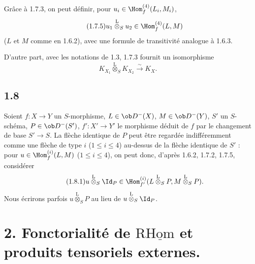 Grâce à 1.7.3, on peut définir, pour $u_i\in\Hom_f^{(4)}(L_i,M_i)$,
\begin{equation}\tag{1.7.5}
u_1\overset{\mathrm{L}}{\otimes}_{S}u_2\in\Hom_f^{(4)}(L,M)
\end{equation}
($L$ et $M$ comme en 1.6.2), avec une formule de transitivité analogue à 1.6.3.

D'autre part, avec les notations de 1.3, 1.7.3 fournit un isomorphisme
\begin{equation}\tag{1.7.6}
K_{X_1}\overset{\mathrm{L}}{\otimes}_{S}K_{X_2}\xrightarrow{\sim}K_X.
\end{equation}

\subsection*{1.8}
Soient $f:X\to Y$ un $S$-morphisme, $L\in\ob D^{-}(X)$, $M\in\ob D^{-}(Y)$, $S'$ un $S$-schéma, $P\in\ob D^{-}(S')$, $f':X'\to Y'$ le morphisme déduit de $f$ par le changement de base $S'\to S$. La flèche identique de $P$ peut être regardée indifféremment comme une flèche de type $i$ ($1\leq i\leq4$) au-dessus de la flèche identique de $S'$ : pour $u\in\Hom_f^{(i)}(L,M)$ ($1\leq i\leq4$), on peut donc, d'après 1.6.2, 1.7.2, 1.7.5, considérer
\begin{equation}\tag{1.8.1}
u\overset{\mathrm{L}}{\otimes}_{S}\Id_P\in\Hom_{f'}^{(i)}(L\overset{\mathrm{L}}{\otimes}_{S}P,M\overset{\mathrm{L}}{\otimes}_{S}P).
\end{equation}
Nous écrirons parfois $u\overset{\mathrm{L}}{\otimes}_{S}P$ au lieu de $u\overset{\mathrm{L}}{\otimes}_{S}\Id_P$.

\section*{2. Fonctorialité de \texorpdfstring{$\mathrm{R}\underline{\mathrm{Hom}}$}{RHom} et produits tensoriels externes.}


